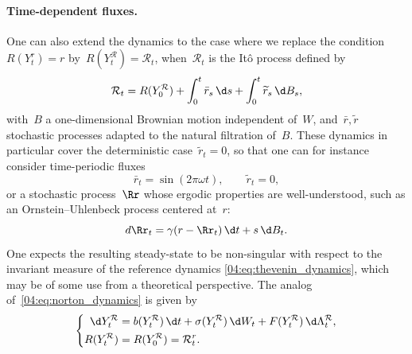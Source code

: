     \paragraph{Time-dependent fluxes.}
    One can also extend the dynamics to the case where we replace the condition~$R(Y_t^r)=r$ by~$R(Y_t^{\mathcal R})=\mathcal{R}_t$, when~$\mathcal{R}_t$ is the Itô process defined by
    \begin{equation}  
    \label{04:eq:norton_sde_R}
    \mathcal{R}_t=R(Y^{\mathcal R}_0) +\int_0^t \bar{r}_s\,\d s + \int_0^t \widetilde{r}_s\,\d B_s,
    \end{equation}
    with~$B$ a one-dimensional Brownian motion independent of~$W$, and~$\bar{r},\widetilde{r}$ stochastic processes adapted to the natural filtration of~$B$.
    These dynamics in particular cover the deterministic case~$\widetilde{r}_t = 0$, so that one can for instance consider time-periodic fluxes
    \[\bar{r}_t = \sin(2\pi \omega t),\qquad \widetilde{r}_t =0,\]
    or a stochastic process~$\Rr$ whose ergodic properties are well-understood, such as an Ornstein--Uhlenbeck process centered at~$r$:
    \[d\Rr_t = \gamma(r-\Rr_t)\,\d t +s\,\d B_t.\]
    One expects the resulting steady-state to be non-singular with respect to the invariant measure of the reference dynamics \eqref{04:eq:thevenin_dynamics}, which may be of some use from a theoretical perspective.
    The analog of~\eqref{04:eq:norton_dynamics} is given by
    \begin{equation}
    \label{04:eq:norton_dynamics_rvar}
    \left\{\begin{aligned}
    \d Y^{\mathcal R}_t &= b(Y^{\mathcal R}_t)\, \d t + \sigma(Y_t^{\mathcal R})\, \d W_t +  F(Y_t^{\mathcal R})\,\d\Lambda^{\mathcal R}_t,\\
    R(Y^{\mathcal R}_t) &= R(Y^{\mathcal R}_0)=\mathcal{R}^r_t.
    \end{aligned}\right.
    \end{equation}


